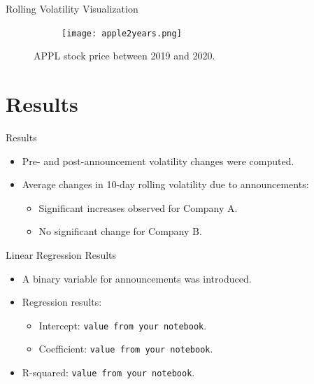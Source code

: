 \documentclass{beamer}
\begin{document}
\begin{frame}{Rolling Volatility Visualization}
  
\begin{figure}
      
      
\begin{figure}
          \centering
          \texttt{[image: apple2years.png]}
          
          \label{fig:enter-label}
      \end{figure}
            \caption{APPL stock price between 2019 and 2020.}
      \label{fig:enter-label}
  \end{figure}
    
\end{frame}
\section{Results}
\begin{frame}{Results}
  \begin{itemize}
    \item Pre- and post-announcement volatility changes were computed.
    \item Average changes in 10-day rolling volatility due to announcements:
      \begin{itemize}
        \item Significant increases observed for Company A.
        \item No significant change for Company B.
      \end{itemize}
  \end{itemize}
\end{frame}

\begin{frame}{Linear Regression Results}
  \begin{itemize}
    \item A binary variable for announcements was introduced.
    \item Regression results:
      \begin{itemize}
        \item Intercept: \texttt{value from your notebook}.
        \item Coefficient: \texttt{value from your notebook}.
      \end{itemize}
    \item R-squared: \texttt{value from your notebook}.
  \end{itemize}
\end{frame}
\end{document}
